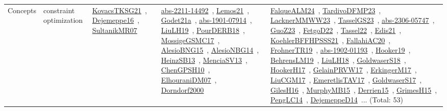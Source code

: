 {\begin{longtable}{lp{3cm}>{\raggedright\arraybackslash}p{6cm}>{\raggedright\arraybackslash}p{6cm}>{\raggedright\arraybackslash}p{8cm}}
\index{constraint optimization}\index{Concepts!constraint optimization}Concepts & constraint optimization & \href{../works/KovacsTKSG21.pdf}{KovacsTKSG21}~\cite{KovacsTKSG21}, \href{../works/Dejemeppe16.pdf}{Dejemeppe16}~\cite{Dejemeppe16}, \href{../works/SultanikMR07.pdf}{SultanikMR07}~\cite{SultanikMR07} & \href{../works/abs-2211-14492.pdf}{abs-2211-14492}~\cite{abs-2211-14492}, \href{../works/Lemos21.pdf}{Lemos21}~\cite{Lemos21}, \href{../works/Godet21a.pdf}{Godet21a}~\cite{Godet21a}, \href{../works/abs-1901-07914.pdf}{abs-1901-07914}~\cite{abs-1901-07914}, \href{../works/LiuLH19.pdf}{LiuLH19}~\cite{LiuLH19}, \href{../works/PourDERB18.pdf}{PourDERB18}~\cite{PourDERB18}, \href{../works/MossigeGSMC17.pdf}{MossigeGSMC17}~\cite{MossigeGSMC17}, \href{../works/AlesioBNG15.pdf}{AlesioBNG15}~\cite{AlesioBNG15}, \href{../works/AlesioNBG14.pdf}{AlesioNBG14}~\cite{AlesioNBG14}, \href{../works/HeinzSB13.pdf}{HeinzSB13}~\cite{HeinzSB13}, \href{../works/MenciaSV13.pdf}{MenciaSV13}~\cite{MenciaSV13}, \href{../works/ChenGPSH10.pdf}{ChenGPSH10}~\cite{ChenGPSH10}, \href{../works/ElhouraniDM07.pdf}{ElhouraniDM07}~\cite{ElhouraniDM07}, \href{../works/Dorndorf2000.pdf}{Dorndorf2000}~\cite{Dorndorf2000} & \href{../works/FalqueALM24.pdf}{FalqueALM24}~\cite{FalqueALM24}, \href{../works/TardivoDFMP23.pdf}{TardivoDFMP23}~\cite{TardivoDFMP23}, \href{../works/LacknerMMWW23.pdf}{LacknerMMWW23}~\cite{LacknerMMWW23}, \href{../works/TasselGS23.pdf}{TasselGS23}~\cite{TasselGS23}, \href{../works/abs-2306-05747.pdf}{abs-2306-05747}~\cite{abs-2306-05747}, \href{../works/GuoZ23.pdf}{GuoZ23}~\cite{GuoZ23}, \href{../works/FetgoD22.pdf}{FetgoD22}~\cite{FetgoD22}, \href{../works/Tassel22.pdf}{Tassel22}~\cite{Tassel22}, \href{../works/Edis21.pdf}{Edis21}~\cite{Edis21}, \href{../works/KoehlerBFFHPSSS21.pdf}{KoehlerBFFHPSSS21}~\cite{KoehlerBFFHPSSS21}, \href{../works/FallahiAC20.pdf}{FallahiAC20}~\cite{FallahiAC20}, \href{../works/FrohnerTR19.pdf}{FrohnerTR19}~\cite{FrohnerTR19}, \href{../works/abs-1902-01193.pdf}{abs-1902-01193}~\cite{abs-1902-01193}, \href{../works/Hooker19.pdf}{Hooker19}~\cite{Hooker19}, \href{../works/BehrensLM19.pdf}{BehrensLM19}~\cite{BehrensLM19}, \href{../works/LiuLH18.pdf}{LiuLH18}~\cite{LiuLH18}, \href{../works/GoldwaserS18.pdf}{GoldwaserS18}~\cite{GoldwaserS18}, \href{../works/HookerH17.pdf}{HookerH17}~\cite{HookerH17}, \href{../works/GelainPRVW17.pdf}{GelainPRVW17}~\cite{GelainPRVW17}, \href{../works/ErkingerM17.pdf}{ErkingerM17}~\cite{ErkingerM17}, \href{../works/LiuCGM17.pdf}{LiuCGM17}~\cite{LiuCGM17}, \href{../works/EmeretlisTAV17.pdf}{EmeretlisTAV17}~\cite{EmeretlisTAV17}, \href{../works/GoldwaserS17.pdf}{GoldwaserS17}~\cite{GoldwaserS17}, \href{../works/GilesH16.pdf}{GilesH16}~\cite{GilesH16}, \href{../works/MurphyMB15.pdf}{MurphyMB15}~\cite{MurphyMB15}, \href{../works/Derrien15.pdf}{Derrien15}~\cite{Derrien15}, \href{../works/GrimesH15.pdf}{GrimesH15}~\cite{GrimesH15}, \href{../works/PengLC14.pdf}{PengLC14}~\cite{PengLC14}, \href{../works/DejemeppeD14.pdf}{DejemeppeD14}~\cite{DejemeppeD14}... (Total: 53)\\

\end{longtable}}
